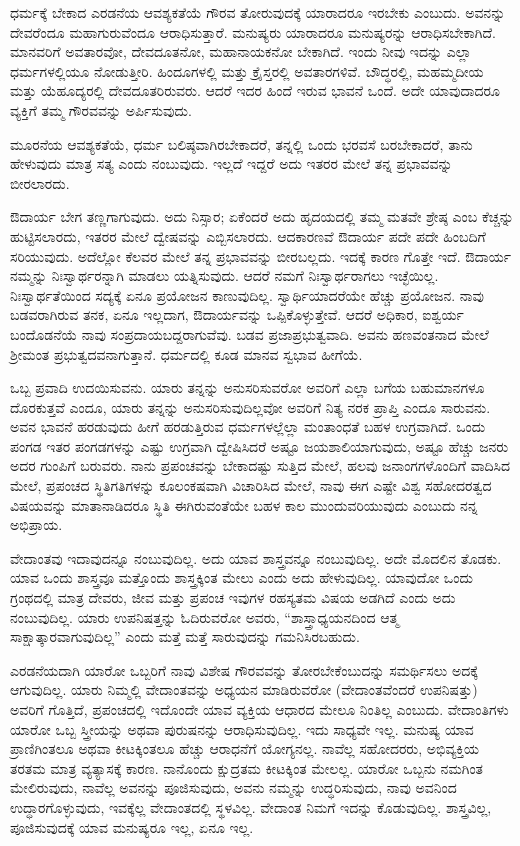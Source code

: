 ಧರ್ಮಕ್ಕೆ ಬೇಕಾದ ಎರಡನೆಯ ಆವಶ್ಯಕತೆಯೆ ಗೌರವ ತೋರುವುದಕ್ಕೆ ಯಾರಾದರೂ ಇರಬೇಕು ಎಂಬುದು. ಅವನನ್ನು ದೇವರೆಂದೂ ಮಹಾಗುರುವೆಂದೂ ಆರಾಧಿಸುತ್ತಾರೆ. ಮನುಷ್ಯರು ಯಾರಾದರೂ ಮನುಷ್ಯರನ್ನು ಆರಾಧಿಸಬೇಕಾಗಿದೆ. ಮಾನವರಿಗೆ ಅವತಾರವೋ, ದೇವದೂತನೋ, ಮಹಾನಾಯಕನೋ ಬೇಕಾಗಿದೆ. ಇಂದು ನೀವು ಇದನ್ನು ಎಲ್ಲಾ ಧರ್ಮಗಳಲ್ಲಿಯೂ ನೋಡುತ್ತೀರಿ. ಹಿಂದೂಗಳಲ್ಲಿ ಮತ್ತು ಕ್ರೈಸ್ತರಲ್ಲಿ ಅವತಾರಗಳಿವೆ. ಬೌದ್ಧರಲ್ಲಿ, ಮಹಮ್ಮದೀಯ ಮತ್ತು ಯೆಹೂದ್ಯರಲ್ಲಿ ದೇವದೂತರಿರುವರು. ಆದರೆ ಇದರ ಹಿಂದೆ ಇರುವ ಭಾವನೆ ಒಂದೆ. ಅದೇ ಯಾವುದಾದರೂ ವ್ಯಕ್ತಿಗೆ ತಮ್ಮ ಗೌರವವನ್ನು ಅರ್ಪಿಸುವುದು.

ಮೂರನೆಯ ಆವಶ್ಯಕತೆಯೆ, ಧರ್ಮ ಬಲಿಷ್ಠವಾಗಿರಬೇಕಾದರೆ, ತನ್ನಲ್ಲಿ ಒಂದು ಭರವಸೆ ಬರಬೇಕಾದರೆ, ತಾನು ಹೇಳುವುದು ಮಾತ್ರ ಸತ್ಯ ಎಂದು ನಂಬುವುದು. ಇಲ್ಲದೆ ಇದ್ದರೆ ಅದು ಇತರರ ಮೇಲೆ ತನ್ನ ಪ್ರಭಾವವನ್ನು ಬೀರಲಾರದು.

ಔದಾರ್ಯ ಬೇಗ ತಣ್ಣಗಾಗುವುದು. ಅದು ನಿಸ್ಸಾರ; ಏಕೆಂದರೆ ಅದು ಹೃದಯದಲ್ಲಿ ತಮ್ಮ ಮತವೇ ಶ್ರೇಷ್ಠ ಎಂಬ ಕೆಚ್ಚನ್ನು ಹುಟ್ಟಿಸಲಾರದು, ಇತರರ ಮೇಲೆ ದ್ವೇಷವನ್ನು ಎಬ್ಬಿಸಲಾರದು. ಆದಕಾರಣವೆ ಔದಾರ್ಯ ಪದೇ ಪದೇ ಹಿಂಬದಿಗೆ ಸರಿಯುವುದು. ಅದೆಲ್ಲೋ ಕೆಲವರ ಮೇಲೆ ತನ್ನ ಪ್ರಭಾವವನ್ನು ಬೀರಬಲ್ಲದು. ಇದಕ್ಕೆ ಕಾರಣ ಗೊತ್ತೇ ಇದೆ. ಔದಾರ್ಯ ನಮ್ಮನ್ನು ನಿಃಸ್ವಾರ್ಥರನ್ನಾಗಿ ಮಾಡಲು ಯತ್ನಿಸುವುದು. ಆದರೆ ನಮಗೆ ನಿಃಸ್ವಾರ್ಥರಾಗಲು ಇಚ್ಛೆಯಿಲ್ಲ. ನಿಃಸ್ವಾರ್ಥತೆಯಿಂದ ಸದ್ಯಕ್ಕೆ ಏನೂ ಪ್ರಯೋಜನ ಕಾಣುವುದಿಲ್ಲ. ಸ್ವಾರ್ಥಿಯಾದರೆಯೇ ಹೆಚ್ಚು ಪ್ರಯೋಜನ. ನಾವು ಬಡವರಾಗಿರುವ ತನಕ, ಏನೂ ಇಲ್ಲದಾಗ, ಔದಾರ್ಯವನ್ನು ಒಪ್ಪಿಕೊಳ್ಳುತ್ತೇವೆ. ಆದರೆ ಅಧಿಕಾರ, ಐಶ್ವರ್ಯ ಬಂದೊಡನೆಯೆ ನಾವು ಸಂಪ್ರದಾಯಬದ್ದರಾಗುವೆವು. ಬಡವ ಪ್ರಜಾಪ್ರಭುತ್ವವಾದಿ. ಅವನು ಹಣವಂತನಾದ ಮೇಲೆ ಶ‍್ರೀಮಂತ ಪ್ರಭುತ್ವದವನಾಗುತ್ತಾನೆ. ಧರ್ಮದಲ್ಲಿ ಕೂಡ ಮಾನವ ಸ್ವಭಾವ ಹೀಗೆಯೆ.

ಒಬ್ಬ ಪ್ರವಾದಿ ಉದಯಿಸುವನು. ಯಾರು ತನ್ನನ್ನು ಅನುಸರಿಸುವರೋ ಅವರಿಗೆ ಎಲ್ಲಾ ಬಗೆಯ ಬಹುಮಾನಗಳೂ ದೊರಕುತ್ತವೆ ಎಂದೂ, ಯಾರು ತನ್ನನ್ನು ಅನುಸರಿಸುವುದಿಲ್ಲವೋ ಅವರಿಗೆ ನಿತ್ಯ ನರಕ ಪ್ರಾಪ್ತಿ ಎಂದೂ ಸಾರುವನು. ಅವನ ಭಾವನೆ ಹರಡುವುದು ಹೀಗೆ ಹರಡುತ್ತಿರುವ ಧರ್ಮಗಳಲ್ಲೆಲ್ಲಾ ಮಂತಾಂಧತೆ ಬಹಳ ಉಗ್ರವಾಗಿದೆ. ಒಂದು ಪಂಗಡ ಇತರ ಪಂಗಡಗಳನ್ನು ಎಷ್ಟು ಉಗ್ರವಾಗಿ ದ್ವೇಷಿಸಿದರೆ ಅಷ್ಟೂ ಜಯಶಾಲಿಯಾಗುವುದು, ಅಷ್ಟೂ ಹೆಚ್ಚು ಜನರು ಅದರ ಗುಂಪಿಗೆ ಬರುವರು. ನಾನು ಪ್ರಪಂಚವನ್ನು ಬೇಕಾದಷ್ಟು ಸುತ್ತಿದ ಮೇಲೆ, ಹಲವು ಜನಾಂಗಗಳೊಂದಿಗೆ ವಾದಿಸಿದ ಮೇಲೆ, ಪ್ರಪಂಚದ ಸ್ಥಿತಿಗತಿಗಳನ್ನು ಕೂಲಂಕಷವಾಗಿ ವಿಚಾರಿಸಿದ ಮೇಲೆ, ನಾವು ಈಗ ಎಷ್ಟೇ ವಿಶ್ವ ಸಹೋದರತ್ವದ ವಿಷಯವನ್ನು ಮಾತಾನಾಡಿದರೂ ಸ್ಥಿತಿ ಈಗಿರುವಂತೆಯೇ ಬಹಳ ಕಾಲ ಮುಂದುವರಿಯುವುದು ಎಂಬುದು ನನ್ನ ಅಭಿಪ್ರಾಯ.

ವೇದಾಂತವು ಇದಾವುದನ್ನೂ ನಂಬುವುದಿಲ್ಲ. ಅದು ಯಾವ ಶಾಸ್ತ್ರವನ್ನೂ ನಂಬುವುದಿಲ್ಲ. ಅದೇ ಮೊದಲಿನ ತೊಡಕು. ಯಾವ ಒಂದು ಶಾಸ್ತ್ರವೂ ಮತ್ತೊಂದು ಶಾಸ್ತ್ರಕ್ಕಿಂತ ಮೇಲು ಎಂದು ಅದು ಹೇಳುವುದಿಲ್ಲ. ಯಾವುದೋ ಒಂದು ಗ್ರಂಥದಲ್ಲಿ ಮಾತ್ರ ದೇವರು, ಜೀವ ಮತ್ತು ಪ್ರಪಂಚ ಇವುಗಳ ರಹಸ್ಯತಮ ವಿಷಯ ಅಡಗಿದೆ ಎಂದು ಅದು ನಂಬುವುದಿಲ್ಲ. ಯಾರು ಉಪನಿಷತ್ತನ್ನು ಓದಿರುವರೋ ಅವರು, “ಶಾಸ್ತ್ರಾಧ್ಯಯನದಿಂದ ಆತ್ಮ ಸಾಕ್ಷಾತ್ಕಾರವಾಗುವುದಿಲ್ಲ” ಎಂದು ಮತ್ತೆ ಮತ್ತೆ ಸಾರುವುದನ್ನು ಗಮನಿಸಿರಬಹುದು.

ಎರಡನೆಯದಾಗಿ ಯಾರೋ ಒಬ್ಬರಿಗೆ ನಾವು ವಿಶೇಷ ಗೌರವವನ್ನು ತೋರಬೇಕೆಂಬುದನ್ನು ಸಮರ್ಥಿಸಲು ಅದಕ್ಕೆ ಆಗುವುದಿಲ್ಲ. ಯಾರು ನಿಮ್ಮಲ್ಲಿ ವೇದಾಂತವನ್ನು ಅಧ್ಯಯನ ಮಾಡಿರುವರೋ (ವೇದಾಂತವೆಂದರೆ ಉಪನಿಷತ್ತು) ಅವರಿಗೆ ಗೊತ್ತಿದೆ, ಪ್ರಪಂಚದಲ್ಲಿ ಇದೊಂದೇ ಯಾವ ವ್ಯಕ್ತಿಯ ಆಧಾರದ ಮೇಲೂ ನಿಂತಿಲ್ಲ ಎಂಬುದು. ವೇದಾಂತಿಗಳು ಯಾರೋ ಒಬ್ಬ ಸ್ತ್ರೀಯನ್ನು ಅಥವಾ ಪುರುಷನನ್ನು ಆರಾಧಿಸುವುದಿಲ್ಲ. ಇದು ಸಾಧ್ಯವೇ ಇಲ್ಲ. ಮನುಷ್ಯ ಯಾವ ಪ್ರಾಣಿಗಿಂತಲೂ ಅಥವಾ ಕೀಟಕ್ಕಿಂತಲೂ ಹೆಚ್ಚು ಆರಾಧನೆಗೆ ಯೋಗ್ಯನಲ್ಲ. ನಾವೆಲ್ಲ ಸಹೋದರರು, ಅಭಿವ್ಯಕ್ತಿಯ ತರತಮ ಮಾತ್ರ ವ್ಯತ್ಯಾಸಕ್ಕೆ ಕಾರಣ. ನಾನೊಂದು ಕ್ಷುದ್ರತಮ ಕೀಟಕ್ಕಿಂತ ಮೇಲಲ್ಲ. ಯಾರೋ ಒಬ್ಬನು ನಮಗಿಂತ ಮೇಲಿರುವುದು, ನಾವೆಲ್ಲ ಅವನನ್ನು ಪೂಜಿಸುವುದು, ಅವನು ನಮ್ಮನ್ನು ಉದ್ಧರಿಸುವುದು, ನಾವು ಅವನಿಂದ ಉದ್ಧಾರಗೊಳ್ಳುವುದು, ಇವಕ್ಕೆಲ್ಲ ವೇದಾಂತದಲ್ಲಿ ಸ್ಥಳವಿಲ್ಲ. ವೇದಾಂತ ನಿಮಗೆ ಇದನ್ನು ಕೊಡುವುದಿಲ್ಲ. ಶಾಸ್ತ್ರವಿಲ್ಲ, ಪೂಜಿಸುವುದಕ್ಕೆ ಯಾವ ಮನುಷ್ಯರೂ ಇಲ್ಲ, ಏನೂ ಇಲ್ಲ.

